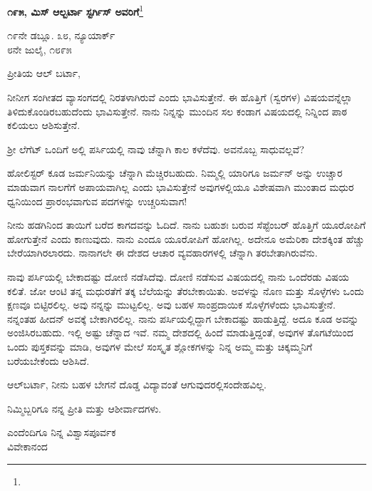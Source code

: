\begin{center}
\textbf{೧೯೫, ಮಿಸ್ ಆಲ್ಬರ್ಟಾ ಸ್ಟರ್ಗಿಸ್ ಅವರಿಗೆ}\footnote{}
\end{center}
\vspace{-0.5cm}

\begin{flushright}
೧೯ನೇ ಡಬ್ಲೂ. ೩೮, ನ್ಯೂಯಾರ್ಕ್\\೮ನೇ ಜುಲೈ, ೧೮೯೫
\end{flushright}
\vspace{-0.3cm}

\noindent
ಪ್ರೀತಿಯ ಆಲ್ ಬರ್ಟಾ,

ನೀನೀಗ ಸಂಗೀತದ ವ್ಯಾಸಂಗದಲ್ಲಿ ನಿರತಳಾಗಿರುವೆ ಎಂದು ಭಾವಿಸುತ್ತೇನೆ. ಈ ಹೊತ್ತಿಗೆ  (ಸ್ವರಗಳ) ವಿಷಯವನ್ನೆಲ್ಲಾ ತಿಳಿದುಕೊಂಡಿರಬಹುದೆಂದು ಭಾವಿಸುತ್ತೇನೆ. ನಾನು ನಿನ್ನನ್ನು ಮುಂದಿನ ಸಲ ಕಂಡಾಗ  ವಿಷಯದಲ್ಲಿ ನಿನ್ನಿಂದ ಪಾಠ ಕಲಿಯಲು ಆಶಿಸುತ್ತೇನೆ.

ಶ‍್ರೀ ಲೆಗೆಟ್ ಒಂದಿಗೆ ಅಲ್ಲಿ ಪರ್ಸಿಯಲ್ಲಿ ನಾವು ಚೆನ್ನಾಗಿ ಕಾಲ ಕಳೆದೆವು. ಅವನೊಬ್ಬ ಸಾಧುವಲ್ಲವೆ?

ಹೋಲಿಸ್ಟರ್ ಕೂಡ ಜರ್ಮನಿಯನ್ನು ಚೆನ್ನಾಗಿ ಮೆಚ್ಚಿರಬಹುದು. ನಿಮ್ಮಲ್ಲಿ ಯಾರಿಗೂ ಜರ್ಮನ್‌ ಅನ್ನು ಉಚ್ಚಾರ ಮಾಡುವಾಗ ನಾಲಗೆಗೆ ಅಪಾಯವಾಗಿಲ್ಲ ಎಂದು ಭಾವಿಸು\break ತ್ತೇನೆ\enginline{-} ಅವುಗಳಲ್ಲಿಯೂ ವಿಶೇಷವಾಗಿ  ಮುಂತಾದ ಮಧುರ ಧ್ವನಿಯಿಂದ ಪ್ರಾರಂಭವಾಗುವ ಪದಗಳನ್ನು ಉಚ್ಚರಿಸುವಾಗ!

ನೀನು ಹಡಗಿನಿಂದ ತಾಯಿಗೆ ಬರೆದ ಕಾಗದವನ್ನು ಓದಿದೆ. ನಾನು ಬಹುಶಃ ಬರುವ ಸೆಪ್ಟೆಂಬರ್‌ ಹೊತ್ತಿಗೆ ಯೂರೋಪಿಗೆ ಹೋಗುತ್ತೇನೆ ಎಂದು ಕಾಣುವುದು. ನಾನು ಎಂದೂ ಯೂರೋಪಿಗೆ ಹೋಗಿಲ್ಲ. ಅದೇನೂ ಅಮೆರಿಕಾ ದೇಶಕ್ಕಿಂತ ಹೆಚ್ಚು ಬೇರೆಯಾಗಿರಲಾರದು. ನಾನಾಗಲೇ ಈ ದೇಶದ ಆಚಾರ ವ್ಯವಹಾರಗಳಲ್ಲಿ ಚೆನ್ನಾಗಿ ತರಬೇತಾಗಿರುವೆನು.

ನಾವು ಪರ್ಸಿಯಲ್ಲಿ ಬೇಕಾದಷ್ಟು ದೋಣಿ ನಡೆಸಿದೆವು. ದೋಣಿ ನಡೆಸುವ ವಿಷಯದಲ್ಲಿ ನಾನು ಒಂದೆರಡು ವಿಷಯ ಕಲಿತೆ. ಜೋ ಆಂಟಿ ತನ್ನ ಮಧುರತೆಗೆ ತಕ್ಕ ಬೆಲೆಯನ್ನು ತೆರಬೇಕಾಯಿತು. ಅವಳನ್ನು ನೊಣ ಮತ್ತು ಸೊಳ್ಳೆಗಳು ಒಂದು ಕ್ಷಣವೂ ಬಿಟ್ಟಿರಲಿಲ್ಲ. ಅವು ನನ್ನನ್ನು ಮುಟ್ಟಲಿಲ್ಲ. ಅವು ಬಹಳ ಸಾಂಪ್ರದಾಯಿಕ ಸೊಳ್ಳೆಗಳೆಂದು ಭಾವಿಸುತ್ತೇನೆ. ನನ್ನಂತಹ ಹೀದನ್ ಅವಕ್ಕೆ ಬೇಕಾಗಿರಲಿಲ್ಲ. ನಾನು ಪರ್ಸಿಯಲ್ಲಿದ್ದಾಗ ಬೇಕಾದಷ್ಟು ಹಾಡುತ್ತಿದ್ದೆ. ಅದೂ ಕೂಡ ಅವನ್ನು ಅಂಜಿಸಿರಬಹುದು. ಇಲ್ಲಿ ಅಷ್ಟು ಚೆನ್ನಾದ  ಇವೆ. ನಮ್ಮ ದೇಶದಲ್ಲಿ ಹಿಂದೆ ಮಾಡುತ್ತಿದ್ದಂತೆ, ಅವುಗಳ ತೊಗಟೆಯಿಂದ ಒಂದು ಪುಸ್ತಕವನ್ನು ಮಾಡಿ, ಅವುಗಳ ಮೇಲೆ ಸಂಸ್ಕೃತ ಶ್ಲೋಕಗಳನ್ನು ನಿನ್ನ ಅಮ್ಮ ಮತ್ತು ಚಿಕ್ಕಮ್ಮನಿಗೆ ಬರೆಯಬೇಕೆಂದು ಆಶಿಸಿದೆ.

ಆಲ್‌ಬರ್ಟಾ, ನೀನು ಬಹಳ ಬೇಗನೆ ದೊಡ್ಡ ವಿದ್ಯಾವಂತೆ ಆಗುವುದರಲ್ಲಿ\break ಸಂದೇಹವಿಲ್ಲ.

ನಿಮ್ಮಿಬ್ಬರಿಗೂ ನನ್ನ ಪ್ರೀತಿ ಮತ್ತು ಆಶೀರ್ವಾದಗಳು.

{\flushright
ಎಂದೆಂದಿಗೂ ನಿನ್ನ ವಿಶ್ವಾಸಪೂರ್ವಕ\\ವಿವೇಕಾನಂದ\par}

